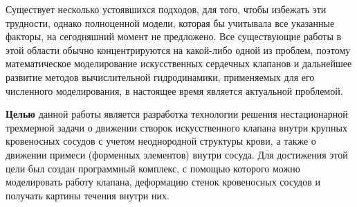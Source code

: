 
Существует несколько устоявшихся подходов, для того, чтобы избежать эти
трудности, однако полноценной модели, которая бы учитывала все указанные
факторы, на сегодняшний момент не предложено. Все существующие работы в этой
области обычно концентрируются на какой-либо одной из проблем, поэтому
математическое моделирование искусственных сердечных клапанов и дальнейшее развитие
методов вычислительной гидродинамики, применяемых для его численного моделирования,
в настоящее время является актуальной проблемой.

\textbf{Целью} данной работы является разработка технологии решения
нестационарной трехмерной задачи о движении створок искусственного клапана
внутри крупных кровеносных сосудов с учетом неоднородной структуры крови, а
также о движении примеси (форменных элементов) внутри сосуда. Для достижения
этой цели был создан программный комплекс, с помощью которого можно
моделировать работу клапана, деформацию стенок кровеносных сосудов и получать
картины течения внутри них.

